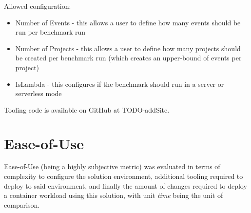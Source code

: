Allowed configuration:
\begin{itemize}
  \item Number of Events - this allows a user to define how many events should be run per benchmark run
  \item Number of Projects - this allows a user to define how many projects should be created per benchmark run (which creates an upper-bound of events per project)
  \item IsLambda - this configures if the benchmark should run in a server or serverless mode
\end{itemize}

Tooling code is available on GitHub at TODO-addSite.

\section{Ease-of-Use}
Ease-of-Use (being a highly subjective metric) was evaluated in terms of complexity to configure the solution environment, additional tooling required to deploy to said environment,
and finally the amount of changes required to deploy a container workload using this solution, with unit \textit{time} being the unit of comparison.

